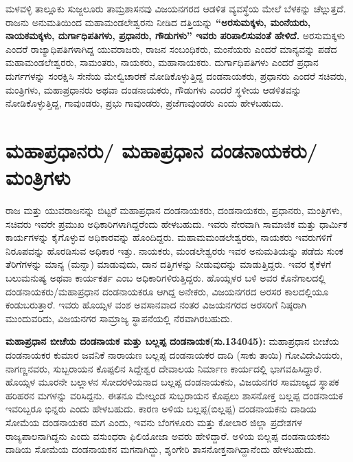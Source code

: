ಮಳವಳ್ಳಿ ತಾಲ್ಲೂಕು ಸುಜ್ಜಲೂರು ತಾಮ್ರಶಾಸನವು ವಿಜಯನಗರದ ಆಡಳಿತ ವ್ಯವಸ್ಥೆಯ ಮೇಲೆ ಬೆಳಕನ್ನು ಚೆಲ್ಲುತ್ತದೆ. ರಾಜನು ಅನುಮತಿಯಿಂದ ಮಹಾಮಂಡಲೇಶ್ವರನು ನೀಡಿದ ದತ್ತಿಯನ್ನು \textbf{“ಅರಸುಮಕ್ಕಳು, ಮಂನೆಯರು, ನಾಯಕಮಕ್ಕಳು, ದುರ್ಗಾಧಿಪತಿಗಳು, ಪ್ರಧಾನರು, ಗೌಡುಗಳು” ಇವರು ಪರಿಪಾಲಿಸುವಂತೆ ಹೇಳಿದೆ.} ಅರಸುಮಕ್ಕಳು ಎಂದರೆ ರಾಜ್ಯಾಧಿಪತಿ\-ಗಳಾಗಿದ್ದ ಯುವರಾಜರು, ರಾಜನ ಸಂಬಂಧಿಕರು, ಮಂನೆಯರು ಎಂದರೆ ಮಾನ್ಯವನ್ನು ಪಡೆದ ಮಹಾಮಂಡಲೇಶ್ವರರು, ಸಾಮಂತರು, ನಾಯಕರು, ಮಹಾನಾಯಕರು. ದುರ್ಗಾಧಿಪತಿಗಳು ಎಂದರೆ ಪ್ರಧಾನ ದುರ್ಗಗಳನ್ನು ಸಂರಕ್ಷಿಸಿ ಸೇನೆಯ ಮೇಲ್ವಿಚಾರಣೆ ನೋಡಿಕೊಳ್ಳುತ್ತಿದ್ದ ದಂಡನಾಯಕರು, ಪ್ರಧಾನರು ಎಂದರೆ ಸಚಿವರು, ಮಂತ್ರಿಗಳು, ಮಹಾಪ್ರಧಾನರು ಅಥವಾ ದಂಡನಾಯಕರು, ಗೌಡುಗಳು ಎಂದರೆ ಸ್ಥಳೀಯ ಆಡಳಿತವನ್ನು ನೋಡಿಕೊಳ್ಳುತ್ತಿದ್ದ, ಗಾವುಂಡರು, ಪ್ರಭು ಗಾವುಂಡರು, ಪ್ರಜೆಗಾವುಂಡರು ಎಂದು ಹೇಳಬಹುದು.


\section{ಮಹಾಪ್ರಧಾನರು/ ಮಹಾಪ್ರಧಾನ ದಂಡನಾಯಕರು/ಮಂತ್ರಿಗಳು}

ರಾಜ ಮತ್ತು ಯುವರಾಜನನ್ನು ಬಿಟ್ಟರೆ ಮಹಾಪ್ರಧಾನ ದಂಡನಾಯಕರು, ದಂಡನಾಯಕರು, ಪ್ರಧಾನರು, ಮಂತ್ರಿಗಳು, ಸಚಿವರು ಇವರೇ ಪ್ರಮುಖ ಅಧಿಕಾರಿಗಳಾಗಿದ್ದರೆಂದು ಹೇಳಬಹುದು. ಇವರು ನೇರವಾಗಿ ಸಾಮಾಜಿಕ ಮತ್ತು ಧಾರ್ಮಿಕ ಕಾರ್ಯಗಳನ್ನು ಕೈಗೊಳ್ಳುವ ಅಧಿಕಾರವನ್ನು ಹೊಂದಿದ್ದರು. ಮಹಾಮಮಂಡಲೇಶ್ವರರು, ನಾಯಕರು ಇವರುಗಳಿಗೆ ನಿರೂಪವನ್ನು ಹೊರಡಿಸುವ ಅಧಿಕಾರ ಇತ್ತು. ನಾಯಕರು, ಮಂಡಲೇಶ್ವರರು ಇವರ ಅನುಮತಿಯನ್ನು ಪಡೆದು ಸುಂಕ ತೆರಿಗೆ\-ಗಳನ್ನು ಮಾನ್ಯ (ಮನ್ನಾ) ಮಾಡುವುದು, ದಾನ ದತ್ತಿಗಳನ್ನು ನೀಡುವುದನ್ನು ಮಾಡುತ್ತಿದ್ದರು. ಇವರ ಕೈಕೆಳಗೆ ಬಲುಮನುಷ್ಯ ಅಥವಾ ಕಾರ್ಯಕರ್ತ ಎಂಬ ಅಧಿಕಾರಿಗಳಿರುತ್ತಿದ್ದರು. ಹೊಯ್ಸಳರ ಬಳಿ ಅವರ ಕೊನೆಗಾಲದಲ್ಲಿ ದಂಡನಾಯಕರು/\-ಮಹಾಪ್ರಧಾನ ದಂಡನಾಯಕರೂ ಆಗಿದ್ದ ಅನೇಕರು, ವಿಜಯನಗರದ ಅರಸರ ಕಾಲದಲ್ಲಿಯೂ ಕಂಡುಬರುತ್ತಾರೆ. ಇವರು ಹೊಯ್ಸಳ ವಂಶ ಅವಸಾನವಾದ ನಂತರ ವಿಜಯನಗರದ ಅರಸರಿಗೆ ನಿಷ್ಠರಾಗಿ ಮುಂದುವರಿದು, ವಿಜಯನಗರ ಸಾಮ್ರಾಜ್ಯ ಸ್ಥಾಪನೆಯಲ್ಲಿ ನೆರವಾಗಿರಬಹುದು.

\textbf{ಮಹಾಪ್ರಧಾನ ಬೀಚೆಯ ದಂಡನಾಯಕ ಮತ್ತು ಬಲ್ಲಪ್ಪ ದಂಡನಾಯಕ(ಸು.1340\general{\enginline{-}}45):} ಮಹಾಪ್ರಧಾನ ಬೀಚೆಯ ದಂಡನಾಯಕರ ಕುಮಾರ ಜವನಿಕೆ ನಾರಾಯಣ ಬಲ್ಲಪ್ಪ ದಂಡನಾಯಕರ ದಾದಿ (ಸಾಕು ತಾಯಿ) ಗೋವಿದೇವಿಯರು, ನಾಗಣ್ಣನವರು, ಸುಬ್ಬರಾಯನ ಕೊಪ್ಪಲಿನ ಸಿದ್ದೇಶ್ವರ ದೇವಾಲಯ ನಿರ್ಮಾಣ ಕಾರ್ಯದಲ್ಲಿ ಭಾಗವಹಿಸಿದ್ದಾರೆ. ಹೊಯ್ಸಳ ಮೂರನೇ ಬಲ್ಲಾಳನ ಸೋದರಳಿಯನಾದ ಬಲ್ಲಪ್ಪ ದಂಡನಾಯಕನು, ವಿಜಯನಗರ ಸಾಮಾಜ್ಯದ ಸ್ಥಾಪಕ ಹರಿಹರನ ಮಗಳನ್ನು ವರಿಸಿದ್ದನು. ಈತನೂ ಮೇಲ್ಕಂಡ ಸುಬ್ಬರಾಯನ ಕೊಪ್ಪಲು ಶಾಸನೋಕ್ತ ಬಲ್ಲಪ್ಪ ದಂಡನಾಯಕ ಇವರಿಬ್ಬರೂ ಭಿನ್ನರು ಎಂದು ಹೇಳಬಹುದು. ಕಾರಣ ಅಳಿಯ ಬಲ್ಲಪ್ಪ(ಬಿಲ್ಲಪ್ಪ) ದಂಡನಾಯಕನು ದಾಡಿಯ ಸೋಮೆಯ ದಂಡನಾಯಕರ ಮಗ ಎಂದು, ಇವನು ಬೆಂಗಳೂರು ಮತ್ತು ಕೋಲಾರ ಜಿಲ್ಲಾ ಪ್ರದೇಶಗಳ ರಾಜ್ಯಪಾಲನಾಗಿದ್ದನು ಎಂದು ವಸುಂಧರಾ ಫಿಲಿಯೋಜಾ ಅವರು ಹೇಳಿದ್ದಾರೆ. ಅಳಿಯ ಬಿಲ್ಲಪ್ಪ ದಂಡನಾಯಕನು ದಾಡಿಯ ಸೋಮೆಯ ದಂಡನಾಯಕನ ಮಗನಾಗಿದ್ದು, ಶೃಂಗೇರಿ ಶಾಸನೋಕ್ತನಾಗಿದ್ದಾನೆಂದು ಹೇಳಬಹುದು.

